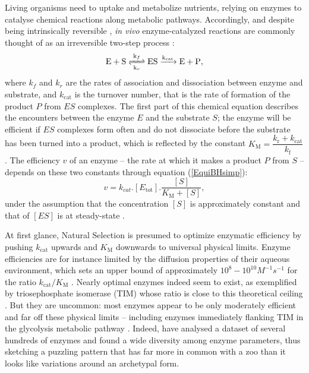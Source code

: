 \documentclass[11pt,onecolumn]{article}
\begin{document}
Living organisms need to uptake and metabolize nutrients, relying on enzymes to catalyse chemical reactions along metabolic pathways. Accordingly, and despite being intrinsically reversible \citep{Haldane30,Klipp94}, \textit{in vivo} enzyme-catalyzed reactions are commonly thought of as an irreversible two-step process \citep{Bar-Even11,Bar-Even15,MichaelisMenten1913,Johnson11}:
\begin{equation}
\ce{ E + S <=>[k_{f}][k_{r}] ES ->[k_{cat}] E + P },
\label{chemMM}
\end{equation}
where $k_f$ and $k_r$ are the rates of association and dissociation between enzyme and substrate, and $k_\text{cat}$ is the turnover number, that is the rate of formation of the product $P$ from $ES$ complexes. The first part of this chemical equation describes the encounters between the enzyme $E$ and the substrate $S$; the enzyme will be efficient if $ES$ complexes form often and do not dissociate before the substrate has been turned into a product, which is reflected by the constant $K_\text{M}=\dfrac{k_\text{r}+k_\text{cat}}{k_\text{f}}$. The efficiency $v$ of an enzyme -- the rate at which it makes a product $P$ from $S$ -- depends on these two constants through equation (\ref{EquiBHsimp}):
\begin{equation}
v=k_{cat}.[E_\text{tot}].\frac{[S]}{K_\text{M}+[S]},
\label{EquiBHsimp}
\end{equation}
\noindent under the assumption that the concentration $[S]$ is approximately constant and that of $[ES]$ is at steady-state \citep{MichaelisMenten1913, Briggs25}.
 
At first glance, Natural Selection is presumed to optimize enzymatic efficiency by pushing $k_\text{cat}$ upwards and $K_\text{M}$ downwards to universal physical limits. Enzyme efficiencies are for instance limited by the diffusion properties of their aqueous environment, which sets an upper bound of approximately $10^8-10^{10} M^{-1}s^{-1}$ for the ratio ${k_\text{cat}}/{K_\text{M}}$  \citep{Alberty58,Zhou82}. Nearly optimal enzymes indeed seem to exist, as exemplified by triosephosphate isomerase (TIM) whose ratio is close to this theoretical ceiling \citep{Knowles77}. But they are uncommon: most enzymes appear to be only moderately efficient and far off these physical limits -- including enzymes immediately flanking TIM in the glycolysis metabolic pathway \citep{Davidi18}.
Indeed, \citet{Bar-Even11} have analysed a dataset of several hundreds of enzymes and found a wide diversity among enzyme parameters, thus sketching a puzzling pattern that has far more in common with a zoo than it looks like variations around an archetypal form.\\
\end{document}
